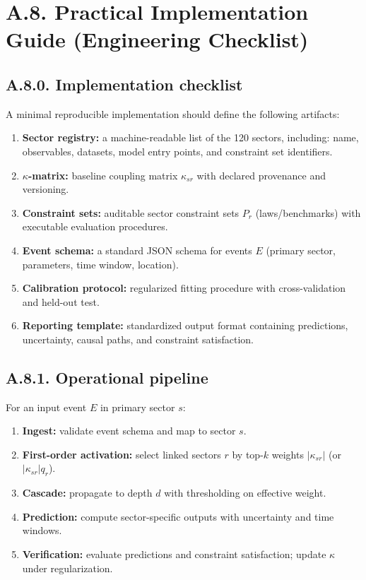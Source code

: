 \documentclass[13pt,a4paper]{article}
\begin{document}
	\section*{A.8. Practical Implementation Guide (Engineering Checklist)}
	
	\subsection*{A.8.0. Implementation checklist}
	A minimal reproducible implementation should define the following artifacts:
	
	\begin{enumerate}[leftmargin=*]
		\item \textbf{Sector registry:} a machine-readable list of the 120 sectors, including: name, observables, datasets, model entry points, and constraint set identifiers.
		\item \textbf{$\kappa$-matrix:} baseline coupling matrix $\kappa_{sr}$ with declared provenance and versioning.
		\item \textbf{Constraint sets:} auditable sector constraint sets $P_r$ (laws/benchmarks) with executable evaluation procedures.
		\item \textbf{Event schema:} a standard JSON schema for events $E$ (primary sector, parameters, time window, location).
		\item \textbf{Calibration protocol:} regularized fitting procedure with cross-validation and held-out test.
		\item \textbf{Reporting template:} standardized output format containing predictions, uncertainty, causal paths, and constraint satisfaction.
	\end{enumerate}
	
	\subsection*{A.8.1. Operational pipeline}
	For an input event $E$ in primary sector $s$:
	\begin{enumerate}[leftmargin=*]
		\item \textbf{Ingest:} validate event schema and map to sector $s$.
		\item \textbf{First-order activation:} select linked sectors $r$ by top-$k$ weights $|\kappa_{sr}|$ (or $|\kappa_{sr}|q_r$).
		\item \textbf{Cascade:} propagate to depth $d$ with thresholding on effective weight.
		\item \textbf{Prediction:} compute sector-specific outputs with uncertainty and time windows.
		\item \textbf{Verification:} evaluate predictions and constraint satisfaction; update $\kappa$ under regularization.
	\end{enumerate}
	
\end{document}
